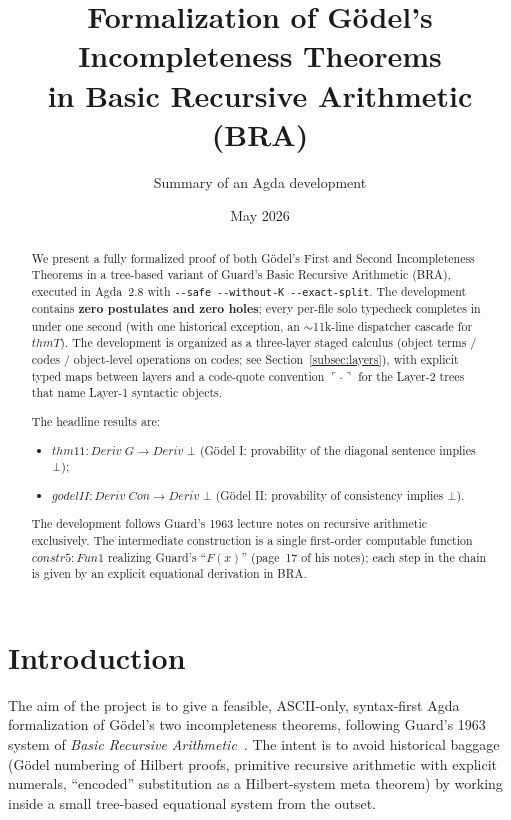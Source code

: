 \documentclass[11pt]{article}
\title{Formalization of G\"odel's Incompleteness Theorems\\
  in Basic Recursive Arithmetic (BRA)}
\author{Summary of an Agda development}
\date{May 2026}
\begin{document}
\maketitle

\begin{abstract}
We present a fully formalized proof of both G\"odel's First and Second
Incompleteness Theorems in a tree-based variant of Guard's Basic
Recursive Arithmetic (BRA), executed in Agda~2.8 with
\verb|--safe --without-K --exact-split|. The development contains
\textbf{zero postulates and zero holes}; every per-file solo
typecheck completes in under one second (with one historical
exception, an $\sim$11k-line dispatcher cascade for $\mathit{thmT}$).
The development is organized as a three-layer staged calculus
(object terms / codes / object-level operations on codes; see
Section~\ref{subsec:layers}), with explicit typed maps between layers
and a code-quote convention $\ulcorner \cdot \urcorner$ for the
Layer-2 trees that name Layer-1 syntactic objects.

The headline results are:
\begin{itemize}
  \item $\mathit{thm11} : \mathit{Deriv}\;G \to \mathit{Deriv}\;\bot$
        (G\"odel I: provability of the diagonal sentence implies $\bot$);
  \item $\mathit{godelII} : \mathit{Deriv}\;\mathit{Con} \to \mathit{Deriv}\;\bot$
        (G\"odel II: provability of consistency implies $\bot$).
\end{itemize}
The development follows Guard's 1963 lecture notes on recursive
arithmetic exclusively.  The intermediate construction is a single
first-order computable function $\mathit{constr5} : \mathit{Fun1}$
realizing Guard's ``$F(x)$'' (page~17 of his notes); each step in the
chain is given by an explicit equational derivation in BRA.
\end{abstract}

\section{Introduction}

The aim of the project is to give a feasible, ASCII-only, syntax-first
Agda formalization of G\"odel's two incompleteness theorems, following
Guard's 1963 system of \emph{Basic Recursive
Arithmetic}~\cite{guard1963}.  The intent is to avoid historical
baggage (G\"odel numbering of Hilbert proofs, primitive recursive
arithmetic with explicit numerals, ``encoded'' substitution as a
Hilbert-system meta theorem) by working inside a small tree-based
equational system from the outset.
\end{document}
